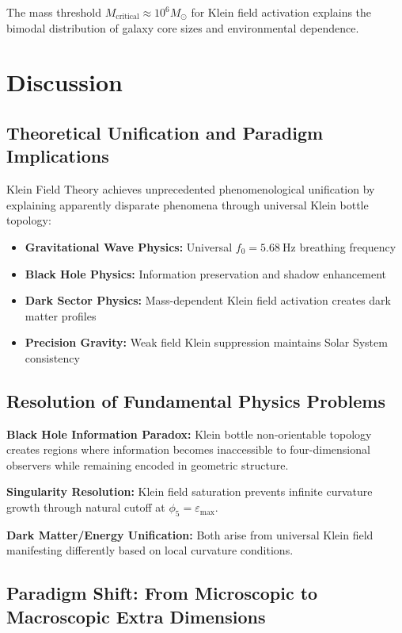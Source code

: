 \documentclass[aps,prl,twocolumn,showpacs,superscriptaddress,groupedaddress]{revtex4-1}
\newcommand{\phifive}{\phi_5}
\newcommand{\epsmax}{\varepsilon_{\text{max}}}
\newcommand{\fzero}{f_0}
\newcommand{\msun}{M_{\odot}}
\begin{document}
The mass threshold $M_{\text{critical}} \approx 10^6 \msun$ for Klein field activation explains the bimodal distribution of galaxy core sizes and environmental dependence.

\section{\label{sec:discussion}Discussion}

\subsection{Theoretical Unification and Paradigm Implications}

Klein Field Theory achieves unprecedented phenomenological unification by explaining apparently disparate phenomena through universal Klein bottle topology:

\begin{itemize}
\item \textbf{Gravitational Wave Physics:} Universal $\fzero = \SI{5.68}{\hertz}$ breathing frequency
\item \textbf{Black Hole Physics:} Information preservation and shadow enhancement
\item \textbf{Dark Sector Physics:} Mass-dependent Klein field activation creates dark matter profiles
\item \textbf{Precision Gravity:} Weak field Klein suppression maintains Solar System consistency
\end{itemize}

\subsection{Resolution of Fundamental Physics Problems}

\textbf{Black Hole Information Paradox:} Klein bottle non-orientable topology creates regions where information becomes inaccessible to four-dimensional observers while remaining encoded in geometric structure.

\textbf{Singularity Resolution:} Klein field saturation prevents infinite curvature growth through natural cutoff at $\phifive = \epsmax$.

\textbf{Dark Matter/Energy Unification:} Both arise from universal Klein field manifesting differently based on local curvature conditions.

\subsection{Paradigm Shift: From Microscopic to Macroscopic Extra Dimensions}
\end{document}
